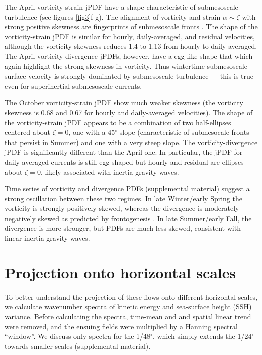 \documentclass[grl]{agutex2015}
\begin{document}
\begin{article}
The April vorticity-strain jPDF have a shape characteristic of submesoscale turbulence
 (see figures \ref{fig3}f-g). The alignment of vorticity and strain $\alpha \sim \zeta$
 with strong positive skewness are fingerprints of submesoscale fronts
 \citep{shcherbina_etal2013,mcwilliams2016}. The shape of the vorticity-strain
 jPDF is similar for hourly, daily-averaged, and residual velocities, although
 the vorticity skewness reduces 1.4 to 1.13 from hourly to daily-averaged.
 The April vorticity-divergence jPDFs, however, have a egg-like shape that which again highlight
 the strong skewness in vorticity. Thus wintertime submesoscale surface velocity
 is strongly dominated by submesoscale turbulence --- this is true even for
 superinertial submesoscale currents.

The October vorticity-strain jPDF show much weaker skewness (the vorticity skewness
is 0.68 and 0.67 for hourly and daily-averaged velocities). The shape of the
 vorticity-strain jPDF  appears to be a combination of two half-ellipses centered
 about $\zeta=0$, one with a 45$^\circ$ slope (characteristic of submesocale fronts
 that persist in Summer) and one with a very steep slope. The vorticity-divergence
 jPDF is significantly different than the April one. In particular, the jPDF
 for daily-averaged currents is still egg-shaped but hourly and residual are
 ellipses about $\zeta=0$, likely associated with inertia-gravity waves.

 Time series of vorticity and divergence PDFs (supplemental material) suggest
 a strong oscillation between these two regimes. In late Winter/early Spring
 the vorticity is strongly positively skewed, whereas the divergence is moderately
 negatively skewed as predicted by frontogenesis \citep{capet_etal2008a,mcwilliams2016}
. In late Summer/early Fall, the divergence is more stronger, but PDFs are much less skewed,
consistent with linear inertia-gravity waves.

\section{Projection onto horizontal scales}

To better understand the projection of these flows onto different horizontal
scales, we calculate wavenumber spectra of kinetic energy and sea-surface height
(SSH) variance.  Before calculating the spectra, time-mean and and spatial linear
trend were removed, and the ensuing fields were multiplied by a Hanning spectral ``window''.
We discuss only spectra for the 1/48$^\circ$, which simply extends the 1/24$^\circ$
towards smaller scales (supplemental material).


\end{article}
\end{document}

